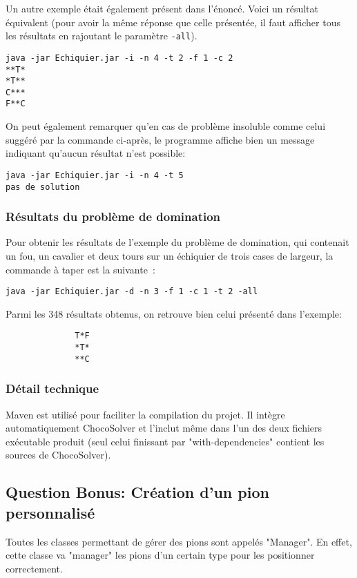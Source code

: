 \documentclass[a4paper,11pt]{article}
\begin{document}
            Un autre exemple était également présent dans l'énoncé.  Voici un résultat équivalent (pour avoir la même réponse que celle présentée, il faut afficher tous les résultats en rajoutant le paramètre \verb|-all|).
            \begin{verbatim}
java -jar Echiquier.jar -i -n 4 -t 2 -f 1 -c 2
**T*
*T**
C***
F**C
			\end{verbatim}
            On peut également remarquer qu'en cas de problème insoluble comme celui suggéré par la commande ci-après, le programme affiche bien un message indiquant qu'aucun résultat n'est possible:
            \begin{verbatim}
java -jar Echiquier.jar -i -n 4 -t 5
pas de solution
        	\end{verbatim}
            
        \subsubsection{Résultats du problème de domination}
        	Pour obtenir les résultats de l'exemple du problème de domination, qui contenait un fou, un cavalier et deux tours sur un échiquier de trois cases de largeur, la commande à taper est la suivante~:
            \begin{verbatim}
java -jar Echiquier.jar -d -n 3 -f 1 -c 1 -t 2 -all
            \end{verbatim}
        	Parmi les 348 résultats obtenus, on retrouve bien celui présenté dans l'exemple:
            \begin{verbatim}
              T*F
              *T*
              **C
            \end{verbatim}
        
        \subsubsection{Détail technique}
        	Maven est utilisé pour faciliter la compilation du projet.  Il intègre automatiquement ChocoSolver et l'inclut même dans l'un des deux fichiers exécutable produit (seul celui finissant par "with-dependencies" contient les sources de ChocoSolver).
        
	\subsection{Question Bonus: Création d'un pion personnalisé}
    	Toutes les classes permettant de gérer des pions sont appelés "Manager".  En effet, cette classe va "manager" les pions d'un certain type pour les positionner correctement.
\end{document}
